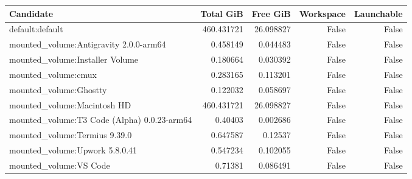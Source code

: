 {\small
\begin{tabular}{lrrrr}
\hline
Candidate & Total GiB & Free GiB & Workspace & Launchable \\
\hline
default:default & 460.431721 & 26.098827 & False & False \\
mounted_volume:Antigravity 2.0.0-arm64 & 0.458149 & 0.044483 & False & False \\
mounted_volume:Installer Volume & 0.180664 & 0.030392 & False & False \\
mounted_volume:cmux & 0.283165 & 0.113201 & False & False \\
mounted_volume:Ghostty & 0.122032 & 0.058697 & False & False \\
mounted_volume:Macintosh HD & 460.431721 & 26.098827 & False & False \\
mounted_volume:T3 Code (Alpha) 0.0.23-arm64 & 0.40403 & 0.002686 & False & False \\
mounted_volume:Termius 9.39.0 & 0.647587 & 0.12537 & False & False \\
mounted_volume:Upwork 5.8.0.41 & 0.547234 & 0.102055 & False & False \\
mounted_volume:VS Code & 0.71381 & 0.086491 & False & False \\
\hline
\end{tabular}
}
